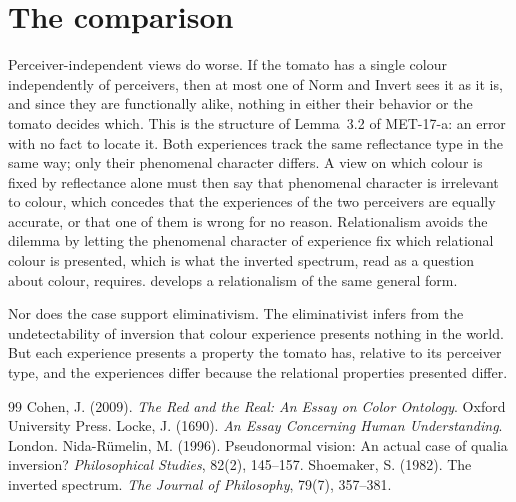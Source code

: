 \documentclass{situationist-preprint}
\begin{document}
\section{The comparison}

Perceiver-independent views do worse. If the tomato has a single colour independently of perceivers, then at most one of Norm and Invert sees it as it is, and since they are functionally alike, nothing in either their behavior or the tomato decides which. This is the structure of Lemma~3.2 of MET-17-a: an error with no fact to locate it. Both experiences track the same reflectance type in the same way; only their phenomenal character differs. A view on which colour is fixed by reflectance alone must then say that phenomenal character is irrelevant to colour, which concedes that the experiences of the two perceivers are equally accurate, or that one of them is wrong for no reason. Relationalism avoids the dilemma by letting the phenomenal character of experience fix which relational colour is presented, which is what the inverted spectrum, read as a question about colour, requires. \citet{Cohen2009} develops a relationalism of the same general form.

Nor does the case support eliminativism. The eliminativist infers from the undetectability of inversion that colour experience presents nothing in the world. But each experience presents a property the tomato has, relative to its perceiver type, and the experiences differ because the relational properties presented differ.

\begin{thebibliography}{99}\small
{} Cohen, J. (2009). \emph{The Red and the Real: An Essay on Color Ontology}. Oxford University Press.
 Locke, J. (1690). \emph{An Essay Concerning Human Understanding}. London.
 Nida-R\"umelin, M. (1996). Pseudonormal vision: An actual case of qualia inversion? \emph{Philosophical Studies}, 82(2), 145--157.
 Shoemaker, S. (1982). The inverted spectrum. \emph{The Journal of Philosophy}, 79(7), 357--381.
\end{thebibliography}
\end{document}
